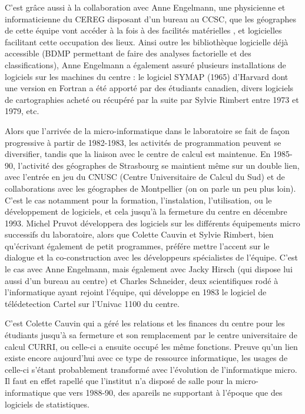 C'est grâce aussi à la collaboration avec Anne Engelmann, une physicienne et informaticienne du CEREG disposant d'un bureau au CCSC, que les géographes de cette équipe vont accéder à la fois à des facilités matérielles , et logicielles facilitant cette occupation des lieux. Ainsi outre les bibliothèque logicielle déjà accessible (BDMP permettant de faire des analyses factorielle et des classifications), Anne Engelmann a également assuré plusieurs installations de logiciels sur les machines du centre : le logiciel SYMAP (1965) d'Harvard dont une version en Fortran a été apporté par des étudiants canadien, divers logiciels de cartographies acheté ou récupéré par la suite par Sylvie Rimbert entre 1973 et 1979, etc.

Alors que l'arrivée de la micro-informatique dans le laboratoire se fait de façon progressive à partir de 1982-1983, les activités de programmation peuvent se diversifier, tandis que la liaison avec le centre de calcul est maintenue. En 1985-90, l'activité des géographes de Strasbourg se maintient même sur un double lien, avec l'entrée en jeu du CNUSC (Centre Universitaire de Calcul du Sud) et de collaborations avec les géographes de Montpellier (on on parle un peu plus loin).  C'est le cas notamment pour la formation, l'instalation, l'utilisation, ou le développement de logiciels, et cela jusqu'à la fermeture du centre en décembre 1993. Michel Pruvot développera des logiciels sur les différents équipements micro successifs du laboratoire, alors que Colette Cauvin et Sylvie Rimbert, bien qu'écrivant également de petit programmes, préfére mettre l'accent sur le dialogue et la co-construction avec les développeurs spécialistes de l'équipe. C'est le cas avec Anne Engelmann, mais également avec Jacky Hirsch (qui dispose lui aussi d'un bureau au centre) et Charles Schneider, deux scientifiques rodé à l'informatique ayant rejoint l'équipe, qui développe en 1983 le logiciel de télédetection Cartel sur l'Univac 1100 du centre. 

C'est Colette Cauvin qui a géré les relations et les finances du centre pour les étudiants jusqu'à sa fermeture et son remplacement par le centre universitaire de calcul CURRI, ou celle-ci a ensuite occupé les même fonctions. Preuve qu'un lien existe encore aujourd'hui avec ce type de ressource informatique, les usages de celle-ci s'étant probablement transformé avec l'évolution de l'informatique micro. Il faut en effet rapellé que l'institut n'a disposé de salle pour la micro-informatique que vers 1988-90, des apareils ne supportant à l'époque que des logiciels de statistiques. 

